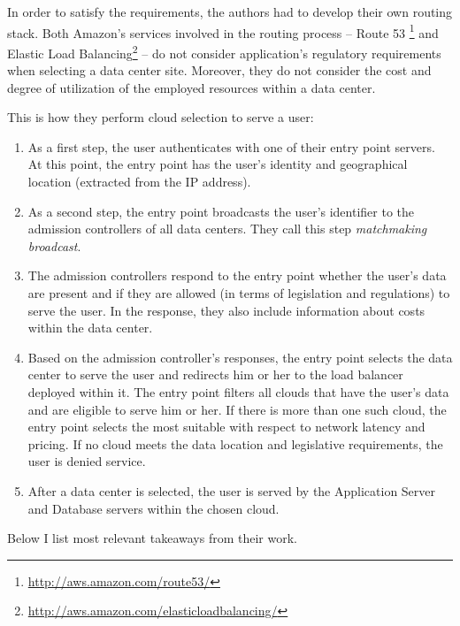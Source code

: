 \documentclass{uvamscse}
\begin{document}
In order to satisfy the requirements, the authors had to develop their own routing stack. Both Amazon's services involved in the routing process -- Route 53 \footnote{\url{http://aws.amazon.com/route53/}} and Elastic Load Balancing\footnote{\url{http://aws.amazon.com/elasticloadbalancing/}} -- do not consider application's regulatory requirements when selecting a data center site. Moreover, they do not consider the cost and degree of utilization of the employed resources within a data center.

This is how they perform cloud selection to serve a user:
\begin{enumerate}
  \item As a first step, the user authenticates with one of their entry point servers. At this point, the entry point has the user’s identity and geographical location (extracted from the IP address).
  \item As a second step, the entry point broadcasts the user’s identifier to the admission controllers of all data centers. They call this step \textit{matchmaking broadcast}.
  \item The admission controllers respond to the entry point whether the user’s data are present and if they are allowed (in terms of legislation and regulations) to serve the user. In the response, they also include information about costs within the data center.
  \item Based on the admission controller's responses, the entry point selects the data center to serve the user and redirects him or her to the load balancer deployed within it. The entry point filters all clouds that have the user’s data and are eligible to serve him or her. If there is more than one such cloud, the entry point selects the most suitable with respect to network latency and pricing. If no cloud meets the data location and legislative requirements, the user is denied service.
  \item After a data center is selected, the user is served by the Application Server and Database servers within the chosen cloud.
\end{enumerate}

Below I list most relevant takeaways from their work.
\end{document}
